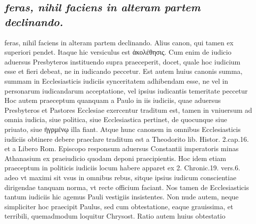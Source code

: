 \documentclass{article}
\begin{document}
\begin{pages}
\subsection*{\textit{feras, nihil faciens in alteram partem declinando.}}feras, nihil faciens in alteram partem declinando. Alius canon, qui tamen ex superiori pendet. Itaque hic versiculus est ἀκολέθησις. Cum enim de iudicio aduersus Presbyteros instituendo supra praeceperit, docet, quale hoc iudicium esse et fieri debeat, ne in iudicando peccetur. Est autem huius canonis summa, summam in Ecclesiasticis iudiciis synceritatem adhibendam esse, ne vel in personarum iudicandarum acceptatione, vel ipsius iudicantis temeritate peccetur Hoc autem praeceptum quanquam a Paulo in iis iudiciis, quae aduersus Presbyteros et Pastores Ecclesiae exercentur traditum est, tamen in vniuersum ad omnia iudicia, siue politica, siue Ecclesiastica pertinet, de quocunque siue priuato, siue ἠγρμένῳ illa fiant. Atque hunc canonem in omnibus Ecclesiasticis iudiciis obtinere debere praeclare traditum est a Theodorito lib.  Histor. 2.cap.16. et a Libero Rom. Episcopo responsum aduersus Constantii imperatoris minas Athanasium ex praeiudicio quodam deponi praecipientis. Hoc idem etiam praeceptum in politicis iudiciis locum habere apparet ex 2. Chronic.19. vers.6. adeo vt maximi sit vsus in omnibus rebus, sitque ipsius iudicum conscientiae dirigendae tanquam norma, vt recte officium faciant. Nos tamen de Ecclesiasticis tantum iudiciis hic agemus Pauli vestigiis insistentes. Non nude autem, neque simpliciter hoc praecipit Paulus, sed cum obtestatione, eaque grauissima, et terribili, quemadmodum loquitur Chrysost. Ratio autem huius obtestatio\pend

\end{pages}
\end{document}
